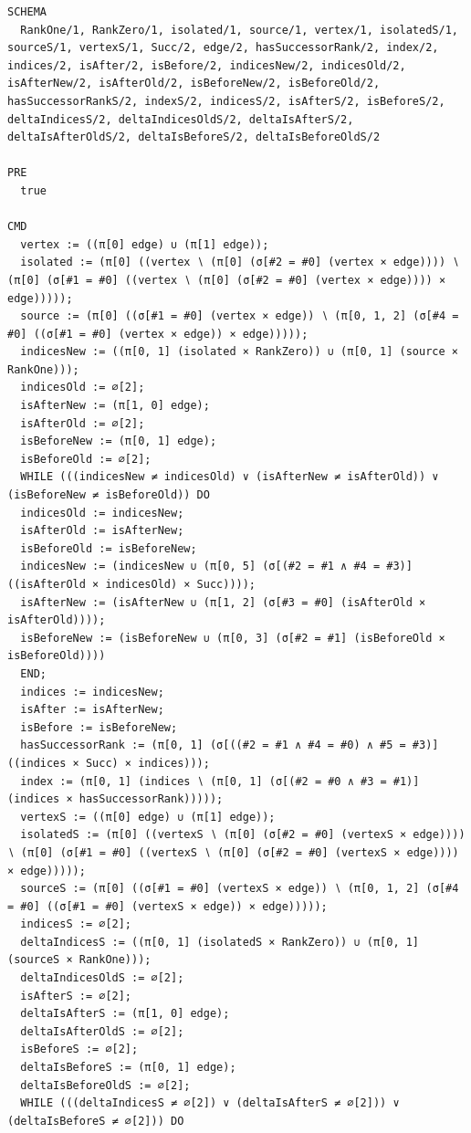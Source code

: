 \documentclass[10pt]{article}
\begin{document}
\begin{Verbatim}[fontsize=\tiny,breaklines=true,breakanywhere=true,frame=single,framesep=1.5mm]
SCHEMA
  RankOne/1, RankZero/1, isolated/1, source/1, vertex/1, isolatedS/1, sourceS/1, vertexS/1, Succ/2, edge/2, hasSuccessorRank/2, index/2, indices/2, isAfter/2, isBefore/2, indicesNew/2, indicesOld/2, isAfterNew/2, isAfterOld/2, isBeforeNew/2, isBeforeOld/2, hasSuccessorRankS/2, indexS/2, indicesS/2, isAfterS/2, isBeforeS/2, deltaIndicesS/2, deltaIndicesOldS/2, deltaIsAfterS/2, deltaIsAfterOldS/2, deltaIsBeforeS/2, deltaIsBeforeOldS/2

PRE
  true 

CMD
  vertex := ((π[0] edge) ∪ (π[1] edge));
  isolated := (π[0] ((vertex ∖ (π[0] (σ[#2 = #0] (vertex × edge)))) ∖ (π[0] (σ[#1 = #0] ((vertex ∖ (π[0] (σ[#2 = #0] (vertex × edge)))) × edge)))));
  source := (π[0] ((σ[#1 = #0] (vertex × edge)) ∖ (π[0, 1, 2] (σ[#4 = #0] ((σ[#1 = #0] (vertex × edge)) × edge)))));
  indicesNew := ((π[0, 1] (isolated × RankZero)) ∪ (π[0, 1] (source × RankOne)));
  indicesOld := ∅[2];
  isAfterNew := (π[1, 0] edge);
  isAfterOld := ∅[2];
  isBeforeNew := (π[0, 1] edge);
  isBeforeOld := ∅[2];
  WHILE (((indicesNew ≠ indicesOld) ∨ (isAfterNew ≠ isAfterOld)) ∨ (isBeforeNew ≠ isBeforeOld)) DO
  indicesOld := indicesNew;
  isAfterOld := isAfterNew;
  isBeforeOld := isBeforeNew;
  indicesNew := (indicesNew ∪ (π[0, 5] (σ[(#2 = #1 ∧ #4 = #3)] ((isAfterOld × indicesOld) × Succ))));
  isAfterNew := (isAfterNew ∪ (π[1, 2] (σ[#3 = #0] (isAfterOld × isAfterOld))));
  isBeforeNew := (isBeforeNew ∪ (π[0, 3] (σ[#2 = #1] (isBeforeOld × isBeforeOld))))
  END;
  indices := indicesNew;
  isAfter := isAfterNew;
  isBefore := isBeforeNew;
  hasSuccessorRank := (π[0, 1] (σ[((#2 = #1 ∧ #4 = #0) ∧ #5 = #3)] ((indices × Succ) × indices)));
  index := (π[0, 1] (indices ∖ (π[0, 1] (σ[(#2 = #0 ∧ #3 = #1)] (indices × hasSuccessorRank)))));
  vertexS := ((π[0] edge) ∪ (π[1] edge));
  isolatedS := (π[0] ((vertexS ∖ (π[0] (σ[#2 = #0] (vertexS × edge)))) ∖ (π[0] (σ[#1 = #0] ((vertexS ∖ (π[0] (σ[#2 = #0] (vertexS × edge)))) × edge)))));
  sourceS := (π[0] ((σ[#1 = #0] (vertexS × edge)) ∖ (π[0, 1, 2] (σ[#4 = #0] ((σ[#1 = #0] (vertexS × edge)) × edge)))));
  indicesS := ∅[2];
  deltaIndicesS := ((π[0, 1] (isolatedS × RankZero)) ∪ (π[0, 1] (sourceS × RankOne)));
  deltaIndicesOldS := ∅[2];
  isAfterS := ∅[2];
  deltaIsAfterS := (π[1, 0] edge);
  deltaIsAfterOldS := ∅[2];
  isBeforeS := ∅[2];
  deltaIsBeforeS := (π[0, 1] edge);
  deltaIsBeforeOldS := ∅[2];
  WHILE (((deltaIndicesS ≠ ∅[2]) ∨ (deltaIsAfterS ≠ ∅[2])) ∨ (deltaIsBeforeS ≠ ∅[2])) DO

\end{Verbatim}
\end{document}
